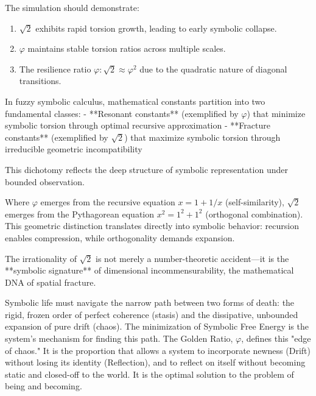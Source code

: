 \begin{scholium}
\label{scholium:bk5_experimental_predictions}
The simulation should demonstrate:
\begin{enumerate}
  \item $\sqrt{2}$ exhibits rapid torsion growth, leading to early symbolic collapse.
  \item $\varphi$ maintains stable torsion ratios across multiple scales.
  \item The resilience ratio $\varphi:\sqrt{2} \approx \varphi^2$ due to the quadratic nature of diagonal transitions.
\end{enumerate}
\end{scholium}

\begin{theorem}
\label{thm:bk5_fundamental_dichotomy}
In fuzzy symbolic calculus, mathematical constants partition into two fundamental classes:
- **Resonant constants** (exemplified by $\varphi$) that minimize symbolic torsion through optimal recursive approximation
- **Fracture constants** (exemplified by $\sqrt{2}$) that maximize symbolic torsion through irreducible geometric incompatibility

This dichotomy reflects the deep structure of symbolic representation under bounded observation.
\end{theorem}

\begin{demonstratio}
\label{demonstratio:bk5_diagonal_dissociation}
Where $\varphi$ emerges from the recursive equation $x = 1 + 1/x$ (self-similarity), $\sqrt{2}$ emerges from the Pythagorean equation $x^2 = 1^2 + 1^2$ (orthogonal combination). This geometric distinction translates directly into symbolic behavior: recursion enables compression, while orthogonality demands expansion.

The irrationality of $\sqrt{2}$ is not merely a number-theoretic accident—it is the **symbolic signature** of dimensional incommensurability, the mathematical DNA of spatial fracture.
\end{demonstratio}

\begin{scholium}
\label{scholium:bk5_life_on_edge_of_chaos}
Symbolic life must navigate the narrow path between two forms of death: the rigid, frozen order of perfect coherence (stasis) and the dissipative, unbounded expansion of pure drift (chaos). The minimization of Symbolic Free Energy is the system's mechanism for finding this path. The Golden Ratio, $\varphi$, defines this "edge of chaos." It is the proportion that allows a system to incorporate newness (Drift) without losing its identity (Reflection), and to reflect on itself without becoming static and closed-off to the world. It is the optimal solution to the problem of being and becoming.
\end{scholium}


